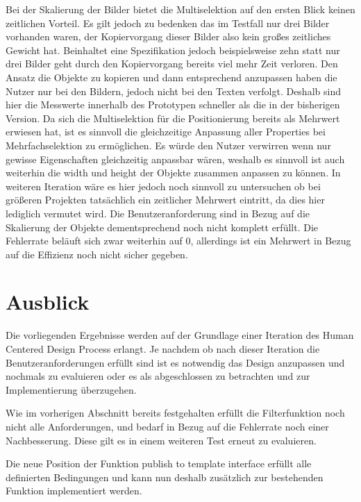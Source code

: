 Bei der Skalierung der Bilder bietet die Multiselektion auf den ersten Blick keinen zeitlichen Vorteil.
Es gilt jedoch zu bedenken das im Testfall nur drei Bilder vorhanden waren, der Kopiervorgang dieser Bilder also kein großes zeitliches Gewicht hat.
Beinhaltet eine Spezifikation jedoch beispielsweise zehn statt nur drei Bilder geht durch den Kopiervorgang bereits viel mehr Zeit verloren.
Den Ansatz die Objekte zu kopieren und dann entsprechend anzupassen haben die Nutzer nur bei den Bildern, jedoch nicht bei den Texten verfolgt.
Deshalb sind hier die Messwerte innerhalb des Prototypen schneller als die in der bisherigen Version.
Da sich die Multiselektion für die Positionierung bereits als Mehrwert erwiesen hat, ist es sinnvoll die gleichzeitige Anpassung aller Properties bei Mehrfachselektion zu ermöglichen.
Es würde den Nutzer verwirren wenn nur gewisse Eigenschaften gleichzeitig anpassbar wären, weshalb es sinnvoll ist auch weiterhin die width und height der Objekte zusammen anpassen zu können.
In weiteren Iteration wäre es hier jedoch noch sinnvoll zu untersuchen ob bei größeren Projekten tatsächlich ein zeitlicher Mehrwert eintritt, da dies hier lediglich vermutet wird.
Die Benutzeranforderung sind in Bezug auf die Skalierung der Objekte dementsprechend noch nicht komplett erfüllt.
Die Fehlerrate beläuft sich zwar weiterhin auf 0, allerdings ist ein Mehrwert in Bezug auf die Effizienz noch nicht sicher gegeben.

\section {Ausblick}
Die vorliegenden Ergebnisse werden auf der Grundlage einer Iteration des Human Centered Design Process erlangt.
Je nachdem ob nach dieser Iteration die Benutzeranforderungen erfüllt sind ist es notwendig das Design anzupassen und nochmals zu evaluieren oder es als abgeschlossen zu betrachten und zur Implementierung überzugehen.

Wie im vorherigen Abschnitt bereits festgehalten erfüllt die Filterfunktion noch nicht alle Anforderungen, und bedarf in Bezug auf die Fehlerrate noch einer Nachbesserung.
Diese gilt es in einem weiteren Test erneut zu evaluieren.

Die neue Position der Funktion \glqq publish to template interface\grqq{} erfüllt alle definierten Bedingungen und kann nun deshalb zusätzlich zur bestehenden Funktion implementiert werden.

